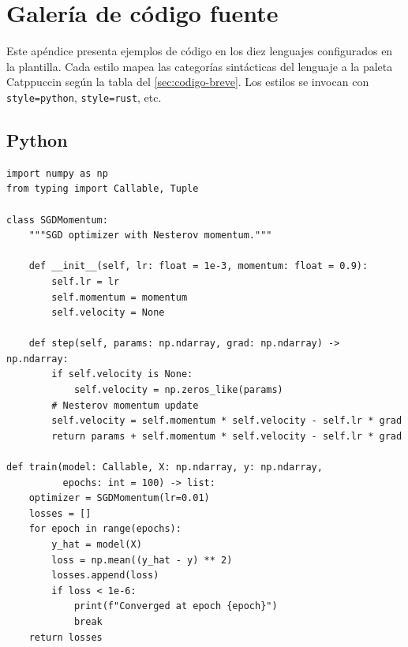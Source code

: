 \chapter{Galería de código fuente}
\label{ap:codigo-galeria}

Este apéndice presenta ejemplos de código en los diez lenguajes configurados
en la plantilla. Cada estilo mapea las categorías sintácticas del lenguaje a
la paleta Catppuccin según la tabla del \cref{sec:codigo-breve}. Los estilos
se invocan con \verb|style=python|, \verb|style=rust|, etc.


\section{Python}

\begin{lstlisting}[style=python, caption={Descenso de gradiente con momentum de Nesterov}]
import numpy as np
from typing import Callable, Tuple

class SGDMomentum:
    """SGD optimizer with Nesterov momentum."""

    def __init__(self, lr: float = 1e-3, momentum: float = 0.9):
        self.lr = lr
        self.momentum = momentum
        self.velocity = None

    def step(self, params: np.ndarray, grad: np.ndarray) -> np.ndarray:
        if self.velocity is None:
            self.velocity = np.zeros_like(params)
        # Nesterov momentum update
        self.velocity = self.momentum * self.velocity - self.lr * grad
        return params + self.momentum * self.velocity - self.lr * grad

def train(model: Callable, X: np.ndarray, y: np.ndarray,
          epochs: int = 100) -> list:
    optimizer = SGDMomentum(lr=0.01)
    losses = []
    for epoch in range(epochs):
        y_hat = model(X)
        loss = np.mean((y_hat - y) ** 2)
        losses.append(loss)
        if loss < 1e-6:
            print(f"Converged at epoch {epoch}")
            break
    return losses
\end{lstlisting}

